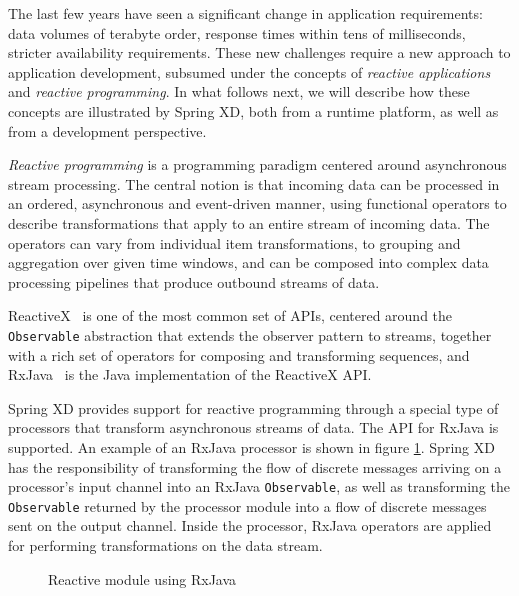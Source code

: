 The last few years have seen a significant change in application requirements:
data volumes of terabyte order, response times within tens of milliseconds, stricter
availability requirements. These new challenges require a new approach to application
development, subsumed under the concepts of \emph{reactive applications} and \emph{reactive
programming}. In what follows next, we will describe how these concepts are
illustrated by Spring XD, both from a runtime platform, as well as from a development perspective.

\emph{Reactive programming} is a programming paradigm centered around asynchronous
stream processing. The central notion is that incoming data can be processed in an
ordered, asynchronous and event-driven manner, using functional operators to describe
transformations that apply to an entire stream of incoming data. The operators can
vary from individual item transformations, to grouping and aggregation over given
time windows, and can be composed into complex data processing pipelines that produce
outbound streams of data.

ReactiveX~\cite{reactivex} is one of the most common set of APIs, centered around
the \texttt{Observable} abstraction that extends the observer pattern to streams,
together with a rich set of operators for composing and transforming sequences, and
RxJava~\cite{rxjava} is the Java implementation of the ReactiveX API.

Spring XD provides support for reactive programming \linebreak
through a special type of processors that transform asynchronous
streams of data. The API for RxJava is supported. An example of an RxJava
processor is shown in figure \ref{fig:rxjava}.
Spring XD has the responsibility of transforming the
flow of discrete messages arriving on a processor's input channel into an
RxJava \texttt{Observable}, as well as transforming the \texttt{Observable}
returned by the processor module into a flow of discrete messages sent on
the output channel. Inside the processor, RxJava operators are applied for
performing transformations on the data stream.

\begin{figure}[ht]
\centering
{}
\caption{Reactive module using RxJava}
\label{fig:rxjava}
\end{figure}
